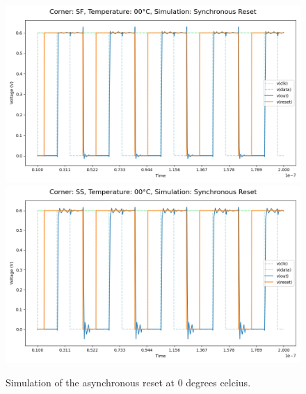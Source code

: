 \begin{figure}[H]
    \vspace{5pt}
    \includegraphics[height= 0.21\textheight]{figures/aimspice/SF00W3.png}
    \vspace{5pt}
    \includegraphics[height= 0.21\textheight]{figures/aimspice/SS00W3.png}
    \caption{Simulation of the asynchronous reset at 0 degrees celcius.}
    \label{fig:aimspice_W3_0}
\end{figure}

\pagebreak

